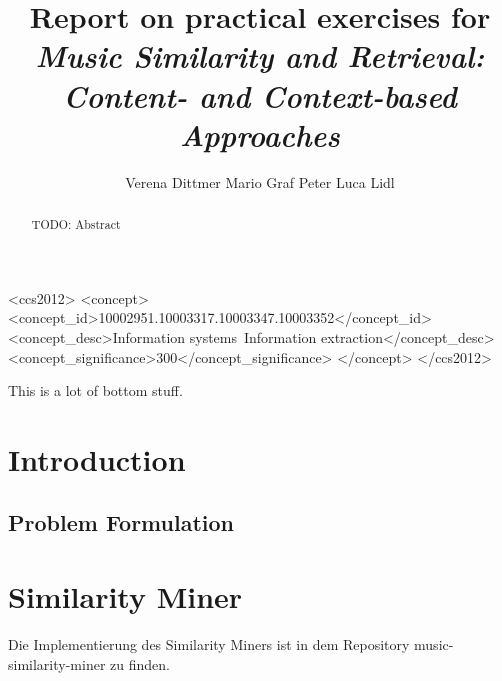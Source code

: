 \documentclass[prodmode,acmtecs]{acmsmall} %
\begin{document}

\title{Report on practical exercises for \emph{Music Similarity and Retrieval: Content- and Context-based Approaches}}
\author{
Verena Dittmer
Mario Graf
Peter Luca Lidl
}

\begin{abstract}
TODO: Abstract
\end{abstract}

%
%
\begin{CCSXML}
<ccs2012>
<concept>
<concept_id>10002951.10003317.10003347.10003352</concept_id>
<concept_desc>Information systems~Information extraction</concept_desc>
<concept_significance>300</concept_significance>
</concept>
</ccs2012>
\end{CCSXML}


%
%



\begin{bottomstuff}
This is a lot of bottom stuff.
\end{bottomstuff}

\maketitle


\section{Introduction}

\subsection{Problem Formulation}

\section{Similarity Miner}
Die Implementierung des Similarity Miners ist in dem Repository music-similarity-miner zu finden.
\end{document}
